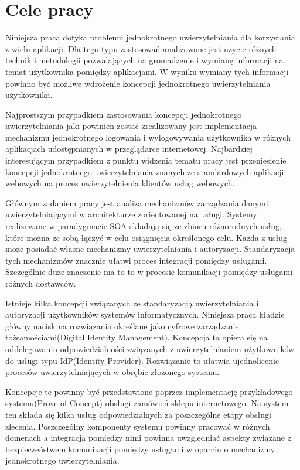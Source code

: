 
\section{Cele pracy}
\label{sec:celePracy}

	Niniejsza praca dotyka problemu jednokrotnego uwierzytelniania dla korzystania z wielu aplikacji. Dla tego typu zastosowań analizowane jest użycie różnych technik i metodologii pozwalających na gromadzenie i wymianę informacji na temat użytkownika pomiędzy aplikacjami. W wyniku wymiany tych informacji powinno być możliwe wdrożenie koncepcji jednokrotnego uwierzytelniania użytkownika.

	Najprostszym przypadkiem zastosowania koncepcji jednokrotnego uwierzytelniania jaki powinien zostać zrealizowany jest implementacja mechanizmu jednokrotnego logowania i wylogowywania użytkownika w różnych aplikacjach udostępnianych w przeglądarce internetowej. Najbardziej interesującym przypadkiem z punktu widzenia tematu pracy jest przeniesienie koncepcji jednokrotnego uwierzytelniania znanych ze standardowych aplikacji webowych na proces uwierzytelnienia klientów usług webowych.

	Głównym zadaniem pracy jest analiza mechanizmów zarządzania danymi uwierzytelniającymi w architekturze zorientowanej na usługi. Systemy realizowane w paradygmacie SOA składają się ze zbioru różnorodnych usług, które można ze sobą łączyć w celu osiągnięcia określonego celu. Każda z usług może posiadać własne mechanizmy uwierzytelniania i autoryzacji. Standaryzacja tych mechanizmów znacznie ułatwi proces integracji pomiędzy usługami. Szczególnie duże znaczenie ma to to w procesie komunikacji pomiędzy usługami różnych dostawców. 

	Istnieje kilka koncepcji związanych ze standaryzacją uwierzytelniania i autoryzacji użytkowników systemów informatycznych. Niniejsza praca kładzie główny nacisk na rozwiązania określane jako cyfrowe zarządzanie tożsamościami(Digital Identity Management). Koncepcja ta opiera się na oddelegowaniu odpowiedzialności związanych z uwierzytelnianiem użytkowników do usługi typu IdP(Identity Provider). Rozwiązanie to ułatwia ujednolicenie procesów uwierzytelniających w obrębie złożonego systemu.

	Koncepcje te powinny być przedstawione poprzez implementację przykładowego systemu(Prove of Concept) obsługi zamówień sklepu internetowego. Na system ten składa się kilka usług odpowiedzialnych za poszczególne etapy obsługi zlecenia. Poszczególny komponenty systemu powinny pracować w różnych domenach a integracja pomiędzy nimi powinna uwzględniać aspekty związane z bezpieczeństwem komunikacji pomiędzy usługami w oparciu o mechanizmy jednokrotnego uwierzytelniania.

